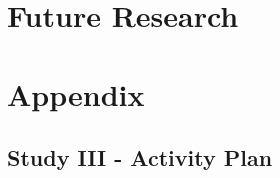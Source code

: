 \chapter{Future Research}



\label{lastpage}

\appendix
\chapter{Appendix}
\section{Study III - Activity Plan}
\label{ap3}


\listoffixmes

